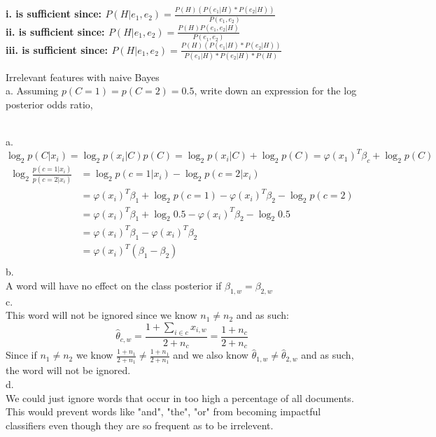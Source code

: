 \documentclass[draft]{exam} %
\renewcommand{\phi}{\varphi}
\theoremstyle{definition} \newtheorem*{defn}{Definition}
\begin{document}
\begin{questions}
\begin{solution}
\textbf{i. is sufficient since: \quad $P(H|e_1,e_2) =\frac{P(H)(P(e_1|H)*P(e_2|H))}{P(e_1,e_2)}$}\\
\textbf{ii. is sufficient since: \quad $P(H|e_1,e_2) =\frac{P(H)P(e_1,e_2|H)}{P(e_1,e_2)}$}\\
\textbf{iii. is sufficient since: \quad $P(H|e_1,e_2) =\frac{P(H)(P(e_1|H)*P(e_2|H))}{P(e_1|H)*P(e_2|H)*P(H)}$}\\
\end{solution} %

  Irrelevant features with naive Bayes\\
a. Assuming $p(C=1)=p(C=2)=0.5$, write down an expression for the log posterior odds ratio,
\begin{solution} \\%
a.\\
$$\log_2{p(C|x_i)} = \log_2{p(x_i|C)p(C)} = \log_2{p(x_i|C)}+\log_2{p(C)} = \phi(x_1)^T\beta_c+\log_2{p(C)}$$
\[
\begin{split}
\log_2{\frac{p(c=1|x_i)}{p(c=2|x_i)}} & = \log_2{p(c=1|x_i)} - \log_2{p(c=2|x_i)} \\
& = \phi(x_i)^T\beta_1+\log_2{p(c=1)}-\phi(x_i)^T\beta_2-\log_2{p(c=2)} \\
& = \phi(x_i)^T\beta_1+\log_2{0.5}-\phi(x_i)^T\beta_2-\log_2{0.5} \\
& = \phi(x_i)^T\beta_1-\phi(x_i)^T\beta_2 \\
& = \phi(x_i)^T(\beta_1-\beta_2) \\
\end{split}
\]
b.\\
A word will have no effect on the class posterior if $\beta_{1,w} = \beta_{2,w}$\\
c.\\
This word will not be ignored since we know $n_1 \neq n_2$ and as such:
$$\hat{\theta}_{c,w}=\frac{1+\sum_{i \in c}{x_{i,w}}}{2+n_c}=\frac{1+n_c}{2+n_c}$$
Since if $n_1 \neq n_2$ we know $\frac{1+n_1}{2+n_1} \neq \frac{1+n_1}{2+n_1}$ and we also know $\hat{\theta}_{1,w} \neq \hat{\theta}_{2,w}$ and as such, the word will not be ignored.\\
d.\\
We could just ignore words that occur in too high a percentage of all documents.  This would prevent words like "and", "the", "or" from becoming impactful classifiers even though they are so frequent as to be irrelevent.
\end{solution} %


\end{questions}
\end{document}
